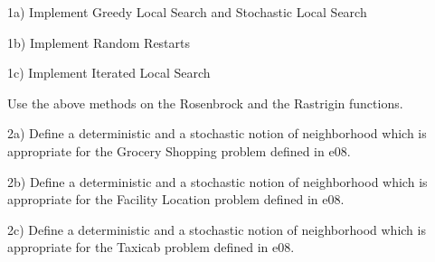 

\renewcommand{\course}{Optimization}
\renewcommand{\coursepicture}{optim}
\renewcommand{\coursedate}{Summer 2015}
\renewcommand{\exnum}{10}

\exercises



1a) Implement Greedy Local Search and Stochastic Local Search

1b) Implement Random Restarts

1c) Implement Iterated Local Search

Use the above methods on the Rosenbrock and the Rastrigin functions.



2a) Define a deterministic and a stochastic notion of neighborhood which is
appropriate for the Grocery Shopping problem defined in e08.

2b) Define a deterministic and a stochastic notion of neighborhood which is
appropriate for the Facility Location problem defined in e08.

2c) Define a deterministic and a stochastic notion of neighborhood which is
appropriate for the Taxicab problem defined in e08.

\exerfoot
